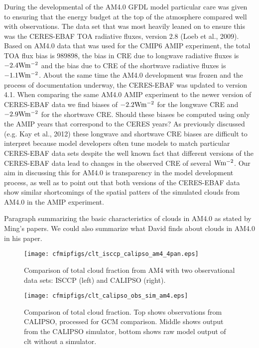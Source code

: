 \documentclass[11pt]{article}   	%
\begin{document}
During the developmental of the AM4.0 GFDL model particular care was given to ensuring that the energy budget at 
the top of the atmosphere compared well with observations.  The data set that was most heavily leaned on to ensure 
this was the CERES-EBAF TOA radiative fluxes, version 2.8 (Loeb et al., 2009).  Based on AM4.0 data that was used for 
the CMIP6 AMIP
experiment, the total TOA flux bias is 989898, the bias in CRE 
due to longwave radiative fluxes is $-2.4 \rm{W m^{-2}} $ and the bias due to CRE of the shortwave radiative fluxes   
is $-1.1 \rm{W m^{-2}} $.  About the same time the AM4.0 development was frozen and the process of documentation 
underway, the CERES-EBAF was updated to version 4.1.  When comparing the same AM4.0 AMIP experiment to the 
newer version of CERES-EBAF data we find biases of $-2.2 \rm{W m^{-2}} $ for the longwave CRE and 
$-2.9 \rm{W m^{-2}} $ for the shortwave CRE.   Should these biases be computed using only the AMIP years that 
correspond to the CERES years?   As previously discussed (e.g. Kay et al., 2012) these longwave and shortwave CRE 
biases are difficult to interpret because model developers often tune models to match particular CERES-EBAF data 
sets despite the well known fact that different versions of the CERES-EBAF data lead to changes in the observed CRE of
several $\rm{W m^{-2}}$.   Our aim in discussing this for AM4.0 is transparency in the model development process, as 
well as to point out that both versions of the CERES-EBAF data show similar shortcomings of the spatial patters of the 
simulated clouds  from AM4.0 in the AMIP experiment.   

Paragraph summarizing the basic characteristics of clouds in AM4.0 as stated by Ming's papers.  We could also summarize 
what David finds about clouds in AM4.0 in his paper.

\begin{figure}
  \texttt{[image: cfmipfigs/clt\_isccp\_calipso\_am4\_4pan.eps]}
  \caption{Comparison of total cloud fraction from AM4 with two observational data sets: ISCCP (left) and CALIPSO (right).}
  \label{fig:clt_isccp_calipso}
\end{figure}

\begin{figure}
  \texttt{[image: cfmipfigs/clt\_calipso\_obs\_sim\_am4.eps]}
  \caption{Comparison of total cloud fraction.  Top shows observations from CALIPSO, processed for GCM comparison.  Middle 
  shows output from the CALIPSO simulator, bottom shows raw model output of clt without a simulator.}
  \label{fig:calipso_sim_vs_mod}
\end{figure}
\end{document}
